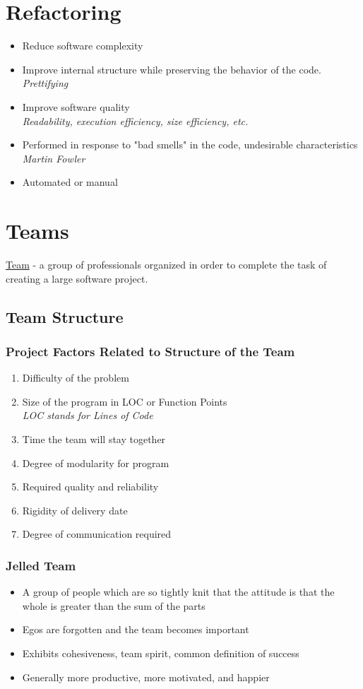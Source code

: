 \documentclass{report}
\begin{document}
		\section{Refactoring}
			\begin{itemize}
				\item Reduce software complexity
				\item Improve internal structure while preserving the behavior of the code.\\
					\textit{Prettifying}
				\item Improve software quality\\
					\textit{Readability, execution efficiency, size efficiency, etc.}
				\item Performed in response to "bad smells" in the code, undesirable characteristics\\
					\textit{Martin Fowler}
				\item Automated or manual\\
			\end{itemize}
		\section{Teams}
			\underline{Team} - a group of professionals organized in order to complete the task of creating a large software project.
			\subsection{Team Structure}
				\subsubsection{Project Factors Related to Structure of the Team}
					\begin{enumerate}
						\item Difficulty of the problem
						\item Size of the program in LOC or Function Points\\
							\textit{LOC stands for Lines of Code}
						\item Time the team will stay together
						\item Degree of modularity for program
						\item Required quality and reliability
						\item Rigidity of delivery date
						\item Degree of communication required
					\end{enumerate}
				\subsubsection{Jelled Team}
					\begin{itemize}
						\item A group of people which are so tightly knit that the attitude is that the whole is greater than the sum of the parts
						\item Egos are forgotten and the team becomes important
						\item Exhibits cohesiveness, team spirit, common definition of success
						\item Generally more productive, more motivated, and happier
					\end{itemize}
\end{document}
